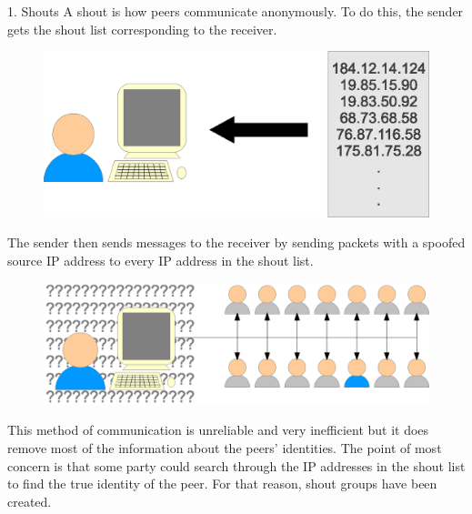 \documentclass[ %
                    author={Luke Murray},
                supervisor={Dr. Simon Hollis},
                     title={Shadow Peer-to-Peer Networks},
                  subtitle={},
                    degree={MEng},
                      year={2013} ]{poster}
\begin{document}
\begin{frame}{}
\begin{columns}[t]
    \begin{column}{0.422\linewidth}
    \begin{block}{\normalsize 1. Shouts}
    \small A shout is how peers communicate anonymously. To do this, the sender gets the shout list corresponding to the receiver.
    \begin{figure}[h]
        \includegraphics{diagrams/poster_get_list.eps}
    \end{figure}
    The sender then sends messages to the receiver by sending packets with a spoofed source IP address to every IP address in the shout list.
    \begin{figure}[h]
        \includegraphics{diagrams/poster_d2.eps}
    \end{figure}
    This method of communication is unreliable and very inefficient but it does remove most of the information about the peers' identities. The point of most concern is that some party could search through the IP addresses in the shout list to find the true identity of the peer. For that reason, shout groups have been created.
    \end{block}
    \end{column}


\end{columns}
\end{frame}
\end{document}
